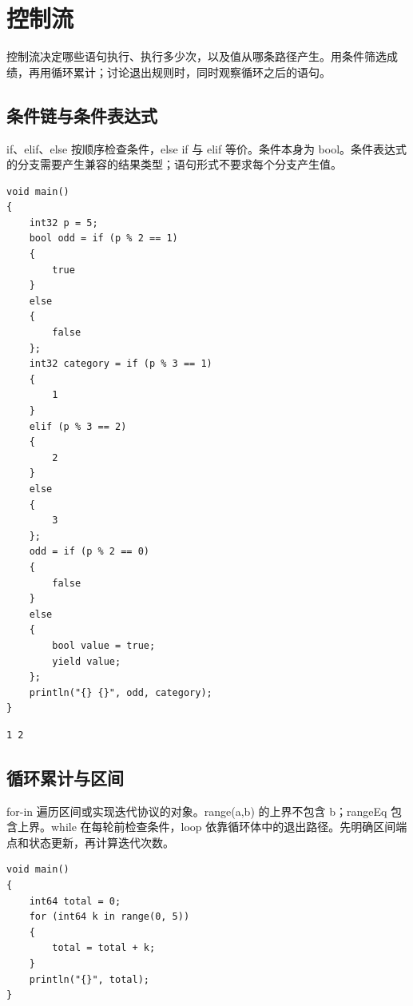 \chapter{控制流}
\label{ch:05}

控制流决定哪些语句执行、执行多少次，以及值从哪条路径产生。用条件筛选成绩，再用循环累计；讨论退出规则时，同时观察循环之后的语句。

\section{条件链与条件表达式}

if、elif、else 按顺序检查条件，else if 与 elif 等价。条件本身为 bool。条件表达式的分支需要产生兼容的结果类型；语句形式不要求每个分支产生值。

\par
\medskip
\begin{lstlisting}[style=chali]
void main()
{
    int32 p = 5;
    bool odd = if (p % 2 == 1)
    {
        true
    }
    else
    {
        false
    };
    int32 category = if (p % 3 == 1)
    {
        1
    }
    elif (p % 3 == 2)
    {
        2
    }
    else
    {
        3
    };
    odd = if (p % 2 == 0)
    {
        false
    }
    else
    {
        bool value = true;
        yield value;
    };
    println("{} {}", odd, category);
}
\end{lstlisting}
\par
\medskip

\par
\medskip
\begin{lstlisting}[style=out]
1 2
\end{lstlisting}
\par
\medskip

\section{循环累计与区间}

for-in 遍历区间或实现迭代协议的对象。range(a,b) 的上界不包含 b；rangeEq 包含上界。while 在每轮前检查条件，loop 依靠循环体中的退出路径。先明确区间端点和状态更新，再计算迭代次数。

\par
\medskip
\begin{lstlisting}[style=chali]
void main()
{
    int64 total = 0;
    for (int64 k in range(0, 5))
    {
        total = total + k;
    }
    println("{}", total);
}
\end{lstlisting}
\par
\medskip

